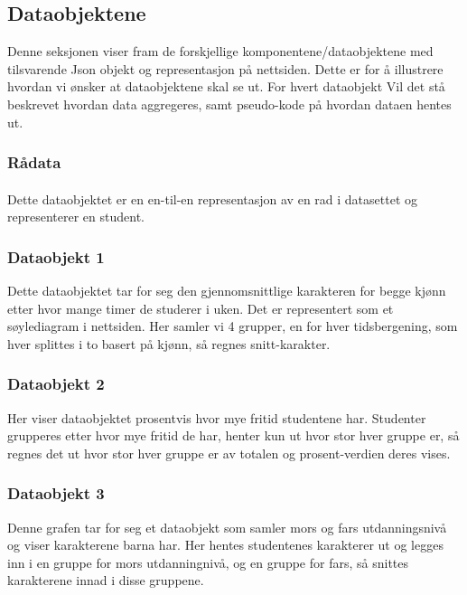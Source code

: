 \subsection{Dataobjektene}
Denne seksjonen viser fram de forskjellige komponentene/dataobjektene med tilsvarende Json objekt og representasjon på nettsiden. Dette er for å illustrere hvordan vi ønsker at dataobjektene skal se ut. For hvert dataobjekt Vil det stå beskrevet hvordan data aggregeres, samt pseudo-kode på hvordan dataen hentes ut.

\subsubsection{Rådata}
\paragraph{}
Dette dataobjektet er en en-til-en representasjon av en rad i datasettet og representerer en student.

\subsubsection{Dataobjekt 1}
Dette dataobjektet tar for seg den gjennomsnittlige karakteren for begge kjønn etter hvor mange timer de studerer i uken. Det er representert som et søylediagram i nettsiden. Her samler vi 4 grupper, en for hver tidsbergening, som hver splittes i to basert på kjønn, så regnes snitt-karakter.

\subsubsection{Dataobjekt 2}
Her viser dataobjektet prosentvis hvor mye fritid studentene har. Studenter grupperes etter hvor mye fritid de har, henter kun ut hvor stor hver gruppe er, så regnes 
det ut hvor stor hver gruppe er av totalen og prosent-verdien deres vises.

\subsubsection{Dataobjekt 3}
Denne grafen tar for seg et dataobjekt som samler mors og fars utdanningsnivå og viser karakterene barna har. Her hentes studentenes karakterer ut og legges inn i en gruppe for mors utdanningnivå, og en gruppe for fars, så snittes karakterene innad i disse gruppene.

